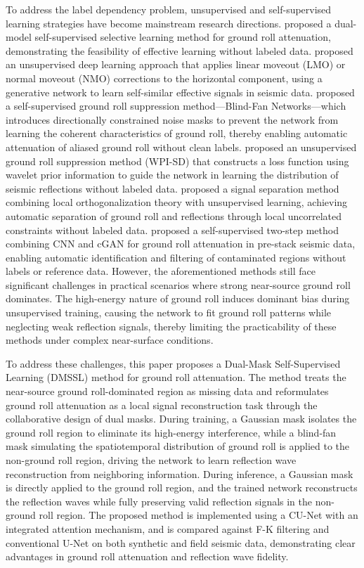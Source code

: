 \documentclass[a4paper,fleqn]{cas-dc}
\begin{document}
To address the label dependency problem, unsupervised and self-supervised learning strategies 
have become mainstream research directions. \citet{son2024ground} proposed a dual-model 
self-supervised selective learning method for ground roll attenuation, demonstrating the 
feasibility of effective learning without labeled data. \citet{liu2023unsupervised} proposed 
an unsupervised deep learning approach that applies linear moveout (LMO) or normal moveout 
(NMO) corrections to the horizontal component, using a generative network to learn 
self-similar effective signals in seismic data. \citet{liu2024self} proposed a self-supervised 
ground roll suppression method---Blind-Fan Networks---which introduces directionally 
constrained noise masks to prevent the network from learning the coherent characteristics 
of ground roll, thereby enabling automatic attenuation of aliased ground roll without clean 
labels. \citet{xia2024unsupervised} proposed an unsupervised ground roll suppression method 
(WPI-SD) that constructs a loss function using wavelet prior information to guide the network 
in learning the distribution of seismic reflections without labeled data. 
\citet{sun2025signal} proposed a signal separation method combining local orthogonalization 
theory with unsupervised learning, achieving automatic separation of ground roll and 
reflections through local uncorrelated constraints without labeled data. 
\citet{oliveira2021self} proposed a self-supervised two-step method combining CNN and cGAN 
for ground roll attenuation in pre-stack seismic data, enabling automatic identification 
and filtering of contaminated regions without labels or reference data. However, the 
aforementioned methods still face significant challenges in practical scenarios where strong 
near-source ground roll dominates. The high-energy nature of ground roll induces dominant 
bias during unsupervised training, causing the network to fit ground roll patterns while 
neglecting weak reflection signals, thereby limiting the practicability of these methods 
under complex near-surface conditions.

To address these challenges, this paper proposes a Dual-Mask Self-Supervised Learning (DMSSL) 
method for ground roll attenuation. The method treats the near-source ground roll-dominated 
region as missing data and reformulates ground roll attenuation as a local signal 
reconstruction task through the collaborative design of dual masks. During training, a 
Gaussian mask isolates the ground roll region to eliminate its high-energy interference, 
while a blind-fan mask simulating the spatiotemporal distribution of ground roll is applied 
to the non-ground roll region, driving the network to learn reflection wave reconstruction 
from neighboring information. During inference, a Gaussian mask is directly applied to the 
ground roll region, and the trained network reconstructs the reflection waves while fully 
preserving valid reflection signals in the non-ground roll region. The proposed method is 
implemented using a CU-Net with an integrated attention mechanism, and is compared against 
F-K filtering and conventional U-Net on both synthetic and field seismic data, demonstrating 
clear advantages in ground roll attenuation and reflection wave fidelity.
\end{document}
